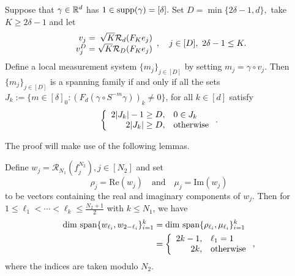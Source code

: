 
\begin{proposition}
  Suppose that $\gamma \in \mathbb{R}^d$ has $1 \in \operatorname{supp}(\gamma) = [\delta].$  Set $D = \min\{2 \delta - 1, d\},$ take $K \ge 2 \delta - 1$ and let \[\begin{array}{r@{\;=\;}r}v_j & \sqrt{K} \mathcal{R}_d(F_K e_j) \\ v_j^D & \sqrt{K} \mathcal{R}_D(F_K e_j) \end{array},\quad j \in [D],\  2 \delta - 1 \le K.\]  Define a local measurement system  $\{m_j\}_{j \in [D]}$ by setting $m_j = \gamma \circ v_j$.  Then $\{m_j\}_{j \in [D]}$ is a spanning family if and only if all the sets $J_k := \{m \in [\delta]_0 : (F_d (\gamma \circ S^{-m} \gamma))_k \neq 0\}$, for all $k \in [d]$ satisfy \[\left\{\begin{array}{r@{,\quad}l} 2 |J_k| - 1 \ge D & 0 \in J_k \\ 2 |J_k| \ge D & \text{otherwise}\end{array}\right..\] \label{prop:span_fam}
\end{proposition}


The proof will make use of the following lemmas.

\begin{lemma}
  Define $w_j = \mathcal{R}_{N_1}(f_j^{N_2}), j \in [N_2]$ and set \[\rho_j = \mathrm{Re}(w_j) \quad\text{and}\quad \mu_j = \mathrm{Im}(w_j)\] to be vectors containing the real and imaginary components of $w_j$.  Then for $1 \le \ell_1 < \cdots < \ell_k \le \frac{N_2 + 1}{2}$ with $k \le N_1$, we have \begin{align*} \dim\,\Span\{w_{\ell_i}, w_{2 - \ell_i}\}_{i = 1}^k &= \dim\,\Span\{\rho_{\ell_i}, \mu_{\ell_i}\}_{i = 1}^k \\ &= \left\{\begin{array}{r@{,\quad}l} 2k - 1 & \ell_1 = 1 \\ 2k & \text{otherwise}\end{array}\right.,\end{align*} where the indices are taken modulo $N_2$. \label{lem:conjugate_span_dim}
\end{lemma}

